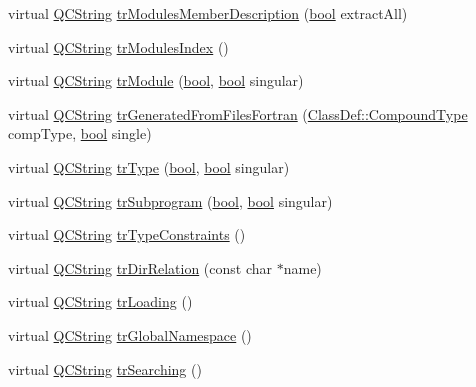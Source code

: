\begin{DoxyCompactItemize}
virtual \hyperlink{class_q_c_string}{Q\+C\+String} \hyperlink{class_translator_german_a4902c094e132773299e9a7966de86620}{tr\+Modules\+Member\+Description} (\hyperlink{qglobal_8h_a1062901a7428fdd9c7f180f5e01ea056}{bool} extract\+All)
\item 
virtual \hyperlink{class_q_c_string}{Q\+C\+String} \hyperlink{class_translator_german_ab54fd39ef008d1bb19cc22f9a2b1f5a6}{tr\+Modules\+Index} ()
\item 
virtual \hyperlink{class_q_c_string}{Q\+C\+String} \hyperlink{class_translator_german_aa4e9a466ac0ad51e393d4d025d572d2f}{tr\+Module} (\hyperlink{qglobal_8h_a1062901a7428fdd9c7f180f5e01ea056}{bool}, \hyperlink{qglobal_8h_a1062901a7428fdd9c7f180f5e01ea056}{bool} singular)
\item 
virtual \hyperlink{class_q_c_string}{Q\+C\+String} \hyperlink{class_translator_german_a864b222b989a57e263dc99de282bab9f}{tr\+Generated\+From\+Files\+Fortran} (\hyperlink{class_class_def_ae70cf86d35fe954a94c566fbcfc87939}{Class\+Def\+::\+Compound\+Type} comp\+Type, \hyperlink{qglobal_8h_a1062901a7428fdd9c7f180f5e01ea056}{bool} single)
\item 
virtual \hyperlink{class_q_c_string}{Q\+C\+String} \hyperlink{class_translator_german_a3d30f2857eaf842e87b2f5e97f0f8aa2}{tr\+Type} (\hyperlink{qglobal_8h_a1062901a7428fdd9c7f180f5e01ea056}{bool}, \hyperlink{qglobal_8h_a1062901a7428fdd9c7f180f5e01ea056}{bool} singular)
\item 
virtual \hyperlink{class_q_c_string}{Q\+C\+String} \hyperlink{class_translator_german_af2cd28365db67ee0377b5920d81e4a06}{tr\+Subprogram} (\hyperlink{qglobal_8h_a1062901a7428fdd9c7f180f5e01ea056}{bool}, \hyperlink{qglobal_8h_a1062901a7428fdd9c7f180f5e01ea056}{bool} singular)
\item 
virtual \hyperlink{class_q_c_string}{Q\+C\+String} \hyperlink{class_translator_german_a75377d22864cfad0cfaaa88047196ab0}{tr\+Type\+Constraints} ()
\item 
virtual \hyperlink{class_q_c_string}{Q\+C\+String} \hyperlink{class_translator_german_ae75c84f71a7b82d8d58702864d01eb41}{tr\+Dir\+Relation} (const char $\ast$name)
\item 
virtual \hyperlink{class_q_c_string}{Q\+C\+String} \hyperlink{class_translator_german_aadbd25cbf2b49a19c92def2f69856af9}{tr\+Loading} ()
\item 
virtual \hyperlink{class_q_c_string}{Q\+C\+String} \hyperlink{class_translator_german_ad47b2d87daf9478787ca318b26ad708a}{tr\+Global\+Namespace} ()
\item 
virtual \hyperlink{class_q_c_string}{Q\+C\+String} \hyperlink{class_translator_german_a725087ef72c6af5da0bf3072ee09be8b}{tr\+Searching} ()

\end{DoxyCompactItemize}
